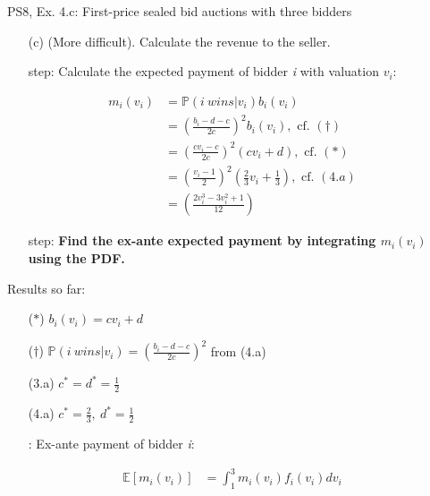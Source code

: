 \begin{frame}{PS8, Ex. 4.c: First-price sealed bid auctions with three bidders}
    \begin{itemize}
      \item[(c)] (More difficult). Calculate the revenue to the seller.
    \end{itemize}
    \vspace{-8pt}
    \begin{multicols}{2}
      \begin{itemize}
        \item[\nth{1} step:] Calculate the expected payment of bidder \textit{i} with valuation $v_i$:
      \end{itemize}
      \vspace{-10pt}
      \begin{align*}
        m_i(v_i)&=\mathbb{P}(i\ wins|v_i)b_i(v_i)\\
                &=\left(\frac{b_i-d-c}{2c}\right)^2b_i(v_i),\text{ cf. }(\dagger)\\
                &=\left(\frac{cv_i-c}{2c}\right)^2(cv_i+d),\text{ cf. }(*)\\
                &=\left(\frac{v_i-1}{2}\right)^2\left(\frac{2}{3}v_i+\frac{1}{3}\right),\text{ cf. }(4.a)\\
                &=\left(\frac{2v_i^3-3v_i^2+1}{12}\right)
      \end{align*}
      \vspace{-10pt}
      \begin{itemize}
        \item[\nth{2} step:] \textbf{Find the ex-ante expected payment by integrating $m_i(v_i)$ using the PDF.}
      \end{itemize}
      \vfill\null\columnbreak
      Results so far:
      \vspace{-6pt}
      \begin{itemize}
        \item[($*$)] $b_i(v_i) = cv_i+d$
        \item[($\dagger$)] $\mathbb{P}(i\ wins|v_i)=\left(\frac{b_i-d-c}{2c}\right)^2$ from (4.a)
        \item[(3.a)] $c^*=d^*=\frac{1}{2}$
        \item[(4.a)] $c^*=\frac{2}{3},\ d^*=\frac{1}{2}$
        \item[\nth{2}:] Ex-ante payment of bidder \textit{i}:
      \end{itemize}
      \vspace{-12pt}
      \begin{align*}
        \mathbb{E}[m_i(v_i)]&=\textstyle\int_1^3m_i(v_i)f_i(v_i)dv_i
      \end{align*}
      \vfill\null
    \end{multicols}
    \vfill\null
\end{frame}
